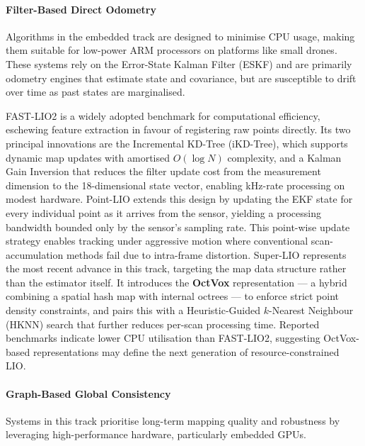 \paragraph{Filter-Based Direct Odometry}
Algorithms in the embedded track are designed to minimise CPU usage, making them suitable for low-power ARM processors on platforms like small drones. These systems rely on the Error-State Kalman Filter (ESKF) and are primarily odometry engines that estimate state and covariance, but are susceptible to drift over time as past states are marginalised.

FAST-LIO2 \cite{xuFASTLIO2FastDirect2022} is a widely adopted benchmark for computational efficiency, eschewing feature extraction in favour of registering raw points directly. Its two principal innovations are the Incremental KD-Tree (iKD-Tree), which supports dynamic map updates with amortised $O(\log N)$ complexity, and a Kalman Gain Inversion that reduces the filter update cost from the measurement dimension to the 18-dimensional state vector, enabling kHz-rate processing on modest hardware. Point-LIO \cite{hePointLIORobustHighBandwidth2023} extends this design by updating the EKF state for every individual point as it arrives from the sensor, yielding a processing bandwidth bounded only by the sensor's sampling rate. This point-wise update strategy enables tracking under aggressive motion where conventional scan-accumulation methods fail due to intra-frame distortion. Super-LIO \cite{wangSuperLIORobustEfficient2025} represents the most recent advance in this track, targeting the map data structure rather than the estimator itself. It introduces the \textbf{OctVox} representation — a hybrid combining a spatial hash map with internal octrees — to enforce strict point density constraints, and pairs this with a Heuristic-Guided $k$-Nearest Neighbour (HKNN) search that further reduces per-scan processing time. Reported benchmarks indicate lower CPU utilisation than FAST-LIO2, suggesting OctVox-based representations may define the next generation of resource-constrained LIO.

\paragraph{Graph-Based Global Consistency}
Systems in this track prioritise long-term mapping quality and robustness by leveraging high-performance hardware, particularly embedded GPUs.

